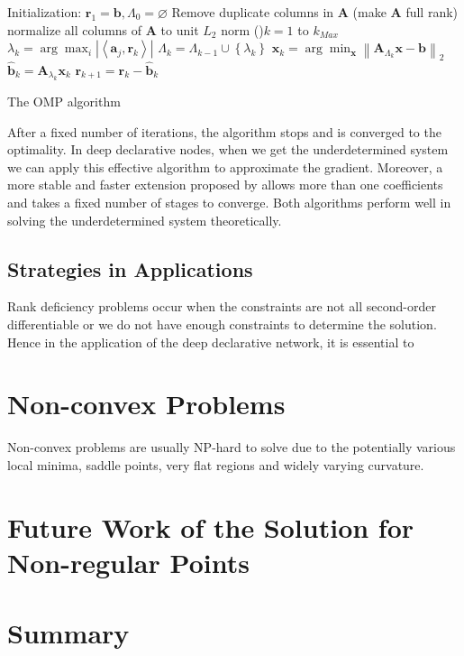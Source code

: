 \begin{algorithm}[H]
    \SetAlgoLined
    Initialization: $\mathbf{r}_{1}=\mathbf{b}, \Lambda_{0}=\varnothing$\;
    Remove duplicate columns in $\mathbf{A}$ (make $\mathbf{A}$ full rank) \;
    normalize all columns of $\mathbf{A}$ to unit $L_2$ norm\;
    \For(){$k=1$ to $k_{Max}$}{
      $\lambda_{k}=\arg \max _{i}\left|\left\langle\mathbf{a}_{j}, \mathbf{r}_{k}\right\rangle\right|$\; 
      $\Lambda_{k}=\Lambda_{k-1} \cup\left\{\lambda_{k}\right\}$\;
      $\mathbf{x}_{k}=\arg \min _{\mathbf{x}}\left\|\mathbf{A}_{\Lambda_{k}} \mathbf{x}-\mathbf{b}\right\|_{2}$\; 
      $\hat{\mathbf{b}}_{k}=\mathbf{A}_{\lambda_{k}} \mathbf{x}_{k}$\; 
      $\mathbf{r}_{k+1}=\mathbf{r}_{k}-\hat{\mathbf{b}}_{k}$
    }
    \caption{The OMP algorithm}
\end{algorithm}
\par After a fixed number of iterations, the algorithm stops and is converged to the optimality. In deep declarative nodes, when we get the underdetermined system we can apply this effective algorithm to approximate the gradient. Moreover, a more stable and faster extension proposed by \cite{DD:58} allows more than one coefficients and takes a fixed number of stages to converge. Both algorithms perform well in solving the underdetermined system theoretically. 

\subsection{Strategies in Applications}
Rank deficiency problems occur when the constraints are not all second-order differentiable or we do not have enough constraints to determine the solution. Hence in the application of the deep declarative network, it is essential to 

\section{Non-convex Problems}
\label{sec:non-convex-sol}
Non-convex problems are usually NP-hard to solve due to the potentially various local minima, saddle points, very flat regions and widely varying curvature. 



\section{Future Work of the Solution for Non-regular Points}
\label{sec:futurework-non}


\section{Summary}
